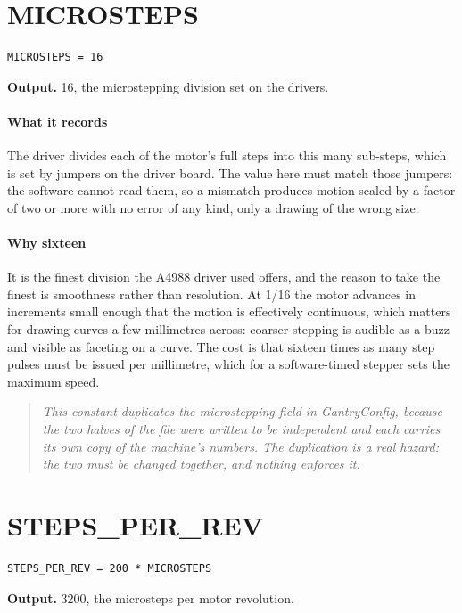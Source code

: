 \section{MICROSTEPS}
\begin{lstlisting}[style=sig]
MICROSTEPS = 16
\end{lstlisting}

\noindent\textbf{Output.} 16, the microstepping division set on the drivers.


\paragraph{What it records}
The driver divides each of the motor's full steps into this many sub-steps, which is set by jumpers on the driver board. The value here must match those jumpers: the software cannot read them, so a mismatch produces motion scaled by a factor of two or more with no error of any kind, only a drawing of the wrong size.


\paragraph{Why sixteen}
It is the finest division the A4988 driver used offers, and the reason to take the finest is smoothness rather than resolution. At 1/16 the motor advances in increments small enough that the motion is effectively continuous, which matters for drawing curves a few millimetres across: coarser stepping is audible as a buzz and visible as faceting on a curve. The cost is that sixteen times as many step pulses must be issued per millimetre, which for a software-timed stepper sets the maximum speed.


\begin{quote}\small\itshape This constant duplicates the microstepping field in GantryConfig, because the two halves of the file were written to be independent and each carries its own copy of the machine's numbers. The duplication is a real hazard: the two must be changed together, and nothing enforces it.\end{quote}

\section{STEPS\_PER\_REV}
\begin{lstlisting}[style=sig]
STEPS_PER_REV = 200 * MICROSTEPS
\end{lstlisting}

\noindent\textbf{Output.} 3200, the microsteps per motor revolution.


